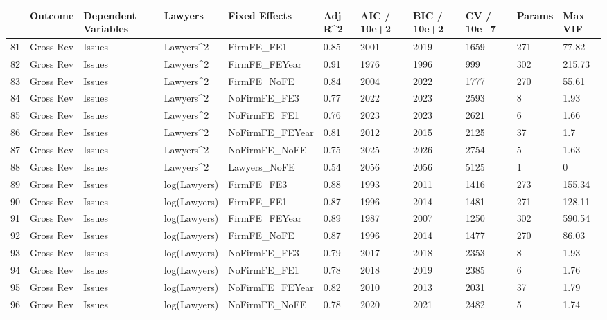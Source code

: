 \documentclass{article}
\begin{document}
\begin{table}[H]
\centering
\begin{tabular}{rllllllllll}
  \hline
 & Outcome & Dependent Variables & Lawyers & Fixed Effects & Adj R^2 & AIC / 10e+2 & BIC / 10e+2 & CV / 10e+7 & Params & Max VIF \\ 
  \hline
81 & Gross Rev & Issues & Lawyers^2 & FirmFE\_FE1 & 0.85 & 2001 & 2019 & 1659 & 271 & 77.82 \\ 
  82 & Gross Rev & Issues & Lawyers^2 & FirmFE\_FEYear & 0.91 & 1976 & 1996 & 999 & 302 & 215.73 \\ 
  83 & Gross Rev & Issues & Lawyers^2 & FirmFE\_NoFE & 0.84 & 2004 & 2022 & 1777 & 270 & 55.61 \\ 
  84 & Gross Rev & Issues & Lawyers^2 & NoFirmFE\_FE3 & 0.77 & 2022 & 2023 & 2593 & 8 & 1.93 \\ 
  85 & Gross Rev & Issues & Lawyers^2 & NoFirmFE\_FE1 & 0.76 & 2023 & 2023 & 2621 & 6 & 1.66 \\ 
  86 & Gross Rev & Issues & Lawyers^2 & NoFirmFE\_FEYear & 0.81 & 2012 & 2015 & 2125 & 37 & 1.7 \\ 
  87 & Gross Rev & Issues & Lawyers^2 & NoFirmFE\_NoFE & 0.75 & 2025 & 2026 & 2754 & 5 & 1.63 \\ 
  88 & Gross Rev & Issues & Lawyers^2 & Lawyers\_NoFE & 0.54 & 2056 & 2056 & 5125 & 1 & 0 \\ 
  89 & Gross Rev & Issues & log(Lawyers) & FirmFE\_FE3 & 0.88 & 1993 & 2011 & 1416 & 273 & 155.34 \\ 
  90 & Gross Rev & Issues & log(Lawyers) & FirmFE\_FE1 & 0.87 & 1996 & 2014 & 1481 & 271 & 128.11 \\ 
  91 & Gross Rev & Issues & log(Lawyers) & FirmFE\_FEYear & 0.89 & 1987 & 2007 & 1250 & 302 & 590.54 \\ 
  92 & Gross Rev & Issues & log(Lawyers) & FirmFE\_NoFE & 0.87 & 1996 & 2014 & 1477 & 270 & 86.03 \\ 
  93 & Gross Rev & Issues & log(Lawyers) & NoFirmFE\_FE3 & 0.79 & 2017 & 2018 & 2353 & 8 & 1.93 \\ 
  94 & Gross Rev & Issues & log(Lawyers) & NoFirmFE\_FE1 & 0.78 & 2018 & 2019 & 2385 & 6 & 1.76 \\ 
  95 & Gross Rev & Issues & log(Lawyers) & NoFirmFE\_FEYear & 0.82 & 2010 & 2013 & 2031 & 37 & 1.79 \\ 
  96 & Gross Rev & Issues & log(Lawyers) & NoFirmFE\_NoFE & 0.78 & 2020 & 2021 & 2482 & 5 & 1.74 \\ 

\end{tabular}
\end{table}
\end{document}
